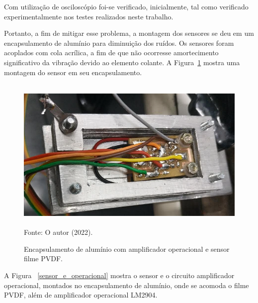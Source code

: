 \documentclass[
	12pt,				
	oneside,			
	a4paper,			
	english,			
	brazil,			
	]{abntex2ppgsi}
\begin{document}
Com utilização de osciloscópio foi-se verificado, inicialmente, tal como verificado experimentalmente nos testes realizados neste trabalho.

Portanto, a fim de mitigar esse problema, a montagem dos sensores se deu em um encapsulamento de alumínio para diminuição dos ruídos. Os sensores foram acoplados com cola acrílica, a fim de que não ocorresse amortecimento significativo da vibração devido ao elemento colante. A Figura~\ref{encapsulamento_sensor} mostra uma montagem do sensor em seu encapsulamento.

\begin{figure}[H]
\centering
\caption {Encapsulamento de alumínio com amplificador operacional e sensor filme PVDF.}
\includegraphics[width=\textwidth,height=75mm,keepaspectratio]{encapsulamento_sensor} \\
Fonte: O autor (2022).
\label{encapsulamento_sensor}
\end{figure} 

A Figura ~\ref{sensor_e_operacional} mostra o sensor e o circuito amplificador operacional, montados no encapsulamento de alumínio, onde se acomoda o filme PVDF, além de amplificador operacional LM2904.
 
\end{document}
